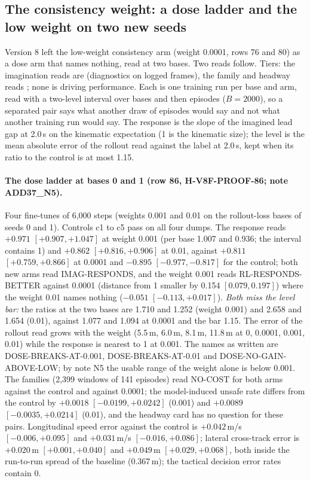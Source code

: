 \subsection{The consistency weight: a dose ladder and the low weight on two new seeds}\label{sec:dose}
Version 8 left the low-weight consistency arm (weight 0.0001, rows 76 and 80) as a dose arm that names nothing, read at two bases. Two reads follow. Tiers: the imagination reads are  (diagnostics on logged frames), the family and headway reads ; none is driving performance. Each is one training run per base and arm, read with a two-level interval over bases and then episodes ($B=2000$), so a separated pair says what another draw of episodes would say and not what another training run would say. The response is the slope of the imagined lead gap at 2.0\,s on the kinematic expectation (1 is the kinematic size); the level is the mean absolute error of the rollout read against the label at 2.0\,s, kept when its ratio to the control is at most 1.15.

\paragraph{The dose ladder at bases 0 and 1 (row 86, H-V8F-PROOF-86; note ADD37\_N5).} Four fine-tunes of 6,000 steps (weights 0.001 and 0.01 on the rollout-loss bases of seeds 0 and 1). Controls c1 to c5 pass on all four dumps. The response reads $+0.971$ $[+0.907,+1.047]$ at weight 0.001 (per base 1.007 and 0.936; the interval contains 1) and $+0.862$ $[+0.816,+0.906]$ at 0.01, against $+0.811$ $[+0.759,+0.866]$ at 0.0001 and $-0.895$ $[-0.977,-0.817]$ for the control; both new arms read IMAG-RESPONDS, and the weight 0.001 reads RL-RESPONDS-BETTER against 0.0001 (distance from 1 smaller by 0.154 $[0.079,0.197]$) where the weight 0.01 names nothing ($-0.051$ $[-0.113,+0.017]$). \emph{Both miss the level bar:} the ratios at the two bases are 1.710 and 1.252 (weight 0.001) and 2.658 and 1.654 (0.01), against 1.077 and 1.094 at 0.0001 and the bar 1.15. The error of the rollout read grows with the weight (5.5\,m, 6.0\,m, 8.1\,m, 11.8\,m at 0, 0.0001, 0.001, 0.01) while the response is nearest to 1 at 0.001. The names as written are DOSE-BREAKS-AT-0.001, DOSE-BREAKS-AT-0.01 and DOSE-NO-GAIN-ABOVE-LOW; by note N5 the usable range of the weight alone is below 0.001. The families (2,399 windows of 141 episodes) read NO-COST for both arms against the control and against 0.0001; the model-induced unsafe rate differs from the control by $+0.0018$ $[-0.0199,+0.0242]$ (0.001) and $+0.0089$ $[-0.0035,+0.0214]$ (0.01), and the headway card has no question for these pairs. Longitudinal speed error against the control is $+0.042$\,m/s $[-0.006,+0.095]$ and $+0.031$\,m/s $[-0.016,+0.086]$; lateral cross-track error is $+0.020$\,m $[+0.001,+0.040]$ and $+0.049$\,m $[+0.029,+0.068]$, both inside the run-to-run spread of the baseline (0.367\,m); the tactical decision error rates contain 0.

